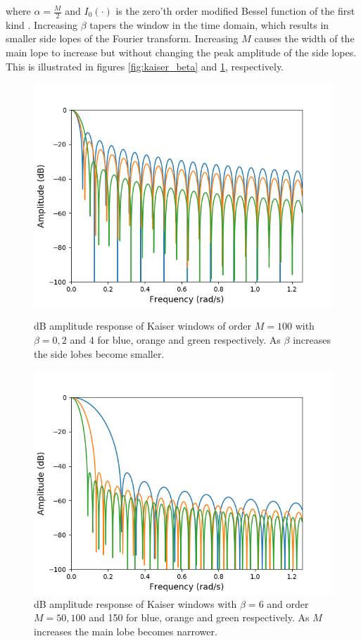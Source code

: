 where $\alpha=\frac{M}{2}$ and $I_0(\cdot)$ is the zero'th order modified Bessel function of the first kind \cite{DTSP, p.474-476}. Increasing $\beta$ tapers the window in the time domain, which results in smaller side lopes of the Fourier transform. Increasing $M$ causes the width of the main lope to increase but without changing the peak amplitude of the side lopes. This is illustrated in figures \ref{fig:kaiser_beta} and \ref{fig:kaiser_order}, respectively.\\

\begin{figure}[H]
\centering
\begin{minipage}{0.49\textwidth}
\centering
\includegraphics[width=\textwidth]{figures/dbplots/kaiser_beta.png}
\caption{dB amplitude response of Kaiser windows of order $M=100$ with $\beta=0,2$ and 4 for blue, orange and green respectively. As $\beta$ increases the side lobes become smaller.}
\label{fig:kaiser_beta}
\end{minipage}
\begin{minipage}{0.49\textwidth}
\centering
\includegraphics[width=\textwidth]{figures/dbplots/kaiser_order.png}
\caption{dB amplitude response of Kaiser windows with $\beta=6$ and order $M=50,100$ and 150 for blue, orange and green respectively. As $M$ increases the main lobe becomes narrower.}
\label{fig:kaiser_order}
\end{minipage}
\end{figure}
 
